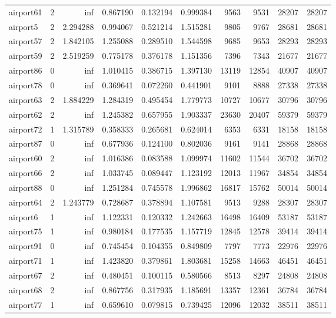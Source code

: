 \begin{longtable}{|l|r|r|r|r|r|r|r|r|r|}
airport61 & 2 & inf & 0.867190 & 0.132194 & 0.999384 & 9563 & 9531 & 28207 & 28207 \\
airport5 & 2 & 2.294288 & 0.994067 & 0.521214 & 1.515281 & 9805 & 9767 & 28681 & 28681 \\
airport57 & 2 & 1.842105 & 1.255088 & 0.289510 & 1.544598 & 9685 & 9653 & 28293 & 28293 \\
airport59 & 2 & 2.519259 & 0.775178 & 0.376178 & 1.151356 & 7396 & 7343 & 21677 & 21677 \\
airport86 & 0 & inf & 1.010415 & 0.386715 & 1.397130 & 13119 & 12854 & 40907 & 40907 \\
airport78 & 0 & inf & 0.369641 & 0.072260 & 0.441901 & 9101 & 8888 & 27338 & 27338 \\
airport63 & 2 & 1.884229 & 1.284319 & 0.495454 & 1.779773 & 10727 & 10677 & 30796 & 30796 \\
airport62 & 2 & inf & 1.245382 & 0.657955 & 1.903337 & 23630 & 20407 & 59379 & 59379 \\
airport72 & 1 & 1.315789 & 0.358333 & 0.265681 & 0.624014 & 6353 & 6331 & 18158 & 18158 \\
airport87 & 0 & inf & 0.677936 & 0.124100 & 0.802036 & 9161 & 9141 & 28868 & 28868 \\
airport60 & 2 & inf & 1.016386 & 0.083588 & 1.099974 & 11602 & 11544 & 36702 & 36702 \\
airport66 & 2 & inf & 1.033745 & 0.089447 & 1.123192 & 12013 & 11967 & 34854 & 34854 \\
airport88 & 0 & inf & 1.251284 & 0.745578 & 1.996862 & 16817 & 15762 & 50014 & 50014 \\
airport64 & 2 & 1.243779 & 0.728687 & 0.378894 & 1.107581 & 9513 & 9288 & 28307 & 28307 \\
airport6 & 1 & inf & 1.122331 & 0.120332 & 1.242663 & 16498 & 16409 & 53187 & 53187 \\
airport75 & 1 & inf & 0.980184 & 0.177535 & 1.157719 & 12845 & 12578 & 39414 & 39414 \\
airport91 & 0 & inf & 0.745454 & 0.104355 & 0.849809 & 7797 & 7773 & 22976 & 22976 \\
airport71 & 1 & inf & 1.423820 & 0.379861 & 1.803681 & 15258 & 14663 & 46451 & 46451 \\
airport67 & 2 & inf & 0.480451 & 0.100115 & 0.580566 & 8513 & 8297 & 24808 & 24808 \\
airport68 & 2 & inf & 0.867756 & 0.317935 & 1.185691 & 13357 & 12361 & 36784 & 36784 \\
airport77 & 1 & inf & 0.659610 & 0.079815 & 0.739425 & 12096 & 12032 & 38511 & 38511 \\

\end{longtable}
